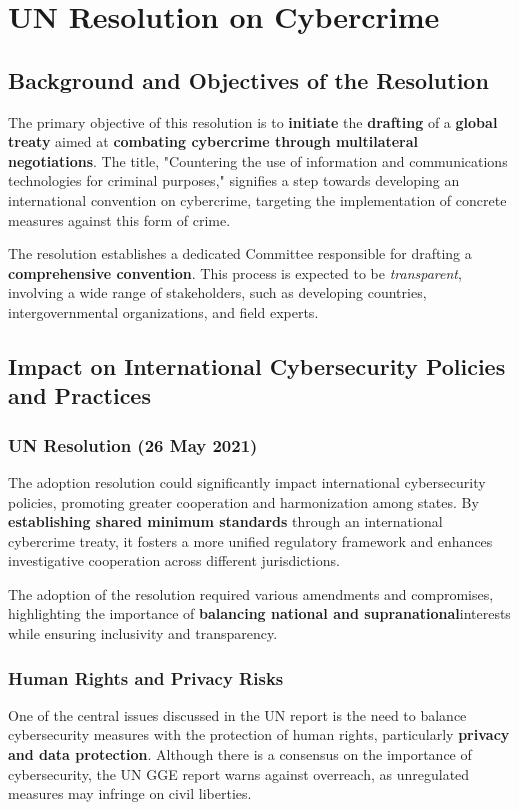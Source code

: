 \chapter{UN Resolution on Cybercrime}

\section{Background and Objectives of the Resolution}
The primary objective of this resolution is to \textbf{initiate} the
\textbf{drafting} of a \textbf{global treaty} aimed at
\textbf{combating cybercrime through multilateral negotiations}. The
title, "Countering the use of information and communications
technologies for criminal purposes," signifies a step towards
developing an international convention on cybercrime, targeting the
implementation of concrete measures against this form of crime.

The resolution establishes a dedicated Committee responsible for
drafting a \textbf{comprehensive convention}. This process is expected
to be \textit{transparent}, involving a wide range of stakeholders,
such as developing countries, intergovernmental organizations, and
field
experts.

\section{Impact on International Cybersecurity Policies and Practices}

\subsection{UN Resolution (26 May 2021)}
The adoption resolution could significantly impact international
cybersecurity policies, promoting greater cooperation and
harmonization among states. By \textbf{establishing shared minimum
standards} through an international cybercrime treaty, it fosters a
more unified regulatory framework and enhances investigative
cooperation across different jurisdictions.

The adoption of the resolution required various amendments and
compromises, highlighting the importance of \textbf{balancing national
and supranational}interests while ensuring inclusivity and
transparency.

\subsection{Human Rights and Privacy Risks}
One of the central issues discussed in the UN report is the need to
balance cybersecurity measures with the protection of human rights,
particularly \textbf{privacy and data protection}. Although there is a
consensus on the importance of cybersecurity, the UN GGE report warns
against overreach, as unregulated measures may infringe on civil
liberties.

